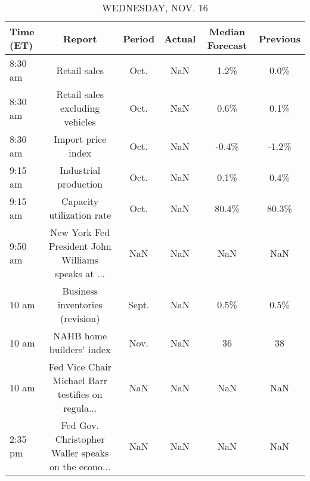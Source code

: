 \documentclass{article}%
\begin{document}
%


\begin{table}[htbp]%
\caption{WEDNESDAY, NOV. 16}%
\centering%
\begin{adjustbox}{width=1\textwidth}%
\begin{tabular}{lccccc}
\toprule
Time (ET) &                                             Report & Period & Actual & Median Forecast & Previous \\
\midrule
  8:30 am &                                       Retail sales &   Oct. &    NaN &            1.2\% &     0.0\% \\
  8:30 am &                    Retail sales excluding vehicles &   Oct. &    NaN &            0.6\% &     0.1\% \\
  8:30 am &                                 Import price index &   Oct. &    NaN &           -0.4\% &    -1.2\% \\
  9:15 am &                              Industrial production &   Oct. &    NaN &            0.1\% &     0.4\% \\
  9:15 am &                          Capacity utilization rate &   Oct. &    NaN &           80.4\% &    80.3\% \\
  9:50 am & New York Fed President John Williams speaks at ... &    NaN &    NaN &             NaN &      NaN \\
    10 am &                    Business inventories (revision) &  Sept. &    NaN &            0.5\% &     0.5\% \\
    10 am &                          NAHB home builders' index &   Nov. &    NaN &              36 &       38 \\
    10 am & Fed Vice Chair Michael Barr testifies on regula... &    NaN &    NaN &             NaN &      NaN \\
  2:35 pm & Fed Gov. Christopher Waller speaks on the econo... &    NaN &    NaN &             NaN &      NaN \\
\bottomrule
\end{tabular}
%
\end{adjustbox}%
\end{table}

%
\end{document}
